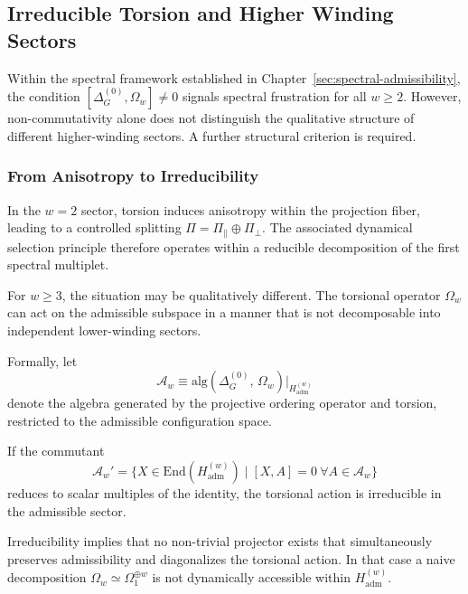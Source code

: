\subsection{Irreducible Torsion and Higher Winding Sectors}
  \label{sec:irreducible-torsion}

  Within the spectral framework established in Chapter~\ref{sec:spectral-admissibility},
  the condition
  \(
  [\Delta^{(0)}_G,\Omega_w]\neq 0
  \)
  signals spectral frustration for all $w\ge 2$.
  However, non-commutativity alone does not distinguish the qualitative
  structure of different higher-winding sectors.
  A further structural criterion is required.

  \subsubsection*{From Anisotropy to Irreducibility}

    In the $w=2$ sector, torsion induces anisotropy within the projection
    fiber, leading to a controlled splitting
    \(
    \Pi = \Pi_{\parallel}\oplus\Pi_{\perp}.
    \)
    The associated dynamical selection principle therefore operates
    within a reducible decomposition of the first spectral multiplet.

    For $w\ge 3$, the situation may be qualitatively different.
    The torsional operator $\Omega_w$ can act on the admissible subspace
    in a manner that is not decomposable into independent lower-winding
    sectors.

    Formally, let
    \begin{equation}
      \mathcal{A}_w
      \equiv
      \mathrm{alg}\!\left(
                      \Delta^{(0)}_G,\,\Omega_w
      \right)
      \Big|_{H_{\mathrm{adm}}^{(w)}}
    \end{equation}
    denote the algebra generated by the projective ordering operator and torsion,
    restricted to the admissible configuration space.

    If the commutant
    \begin{equation}
      \mathcal{A}_w'
      =
      \big\{
      X\in\mathrm{End}(H_{\mathrm{adm}}^{(w)})
      \mid
      [X,A]=0\ \forall A\in\mathcal{A}_w
      \big\}
    \end{equation}
    reduces to scalar multiples of the identity,
    the torsional action is irreducible in the admissible sector.

    Irreducibility implies that no non-trivial projector exists that
    simultaneously preserves admissibility and diagonalizes the torsional
    action.
    In that case a naive decomposition
    \(
    \Omega_w \simeq \Omega_{1}^{\oplus w}
    \)
    is not dynamically accessible within $H_{\mathrm{adm}}^{(w)}$.

